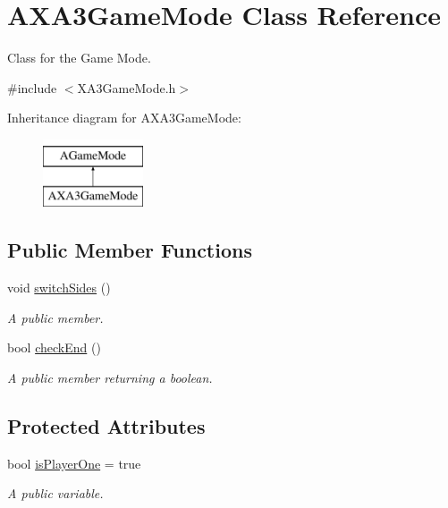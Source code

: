 \hypertarget{class_a_x_a3_game_mode}{}\section{A\+X\+A3\+Game\+Mode Class Reference}
\label{class_a_x_a3_game_mode}


Class for the Game Mode.  




{\ttfamily \#include $<$X\+A3\+Game\+Mode.\+h$>$}

Inheritance diagram for A\+X\+A3\+Game\+Mode\+:\begin{figure}[H]
\begin{center}
\leavevmode
\includegraphics[height=2.000000cm]{class_a_x_a3_game_mode}
\end{center}
\end{figure}
\subsection*{Public Member Functions}
\begin{DoxyCompactItemize}
\item 
void \hyperlink{class_a_x_a3_game_mode_a5b84f33f7978a2015a870a6daab2ee68}{switch\+Sides} ()
\begin{DoxyCompactList}\small\item\em A public member. \end{DoxyCompactList}\item 
bool \hyperlink{class_a_x_a3_game_mode_a0a00cfd9dc6792556a48235fe9b7b151}{check\+End} ()
\begin{DoxyCompactList}\small\item\em A public member returning a boolean. \end{DoxyCompactList}\end{DoxyCompactItemize}
\subsection*{Protected Attributes}
\begin{DoxyCompactItemize}
\item 
bool \hyperlink{class_a_x_a3_game_mode_ab240472b5b7ebecb719d972ae3ad1167}{is\+Player\+One} = true
\begin{DoxyCompactList}\small\item\em A public variable. \end{DoxyCompactList}\end{DoxyCompactItemize}


